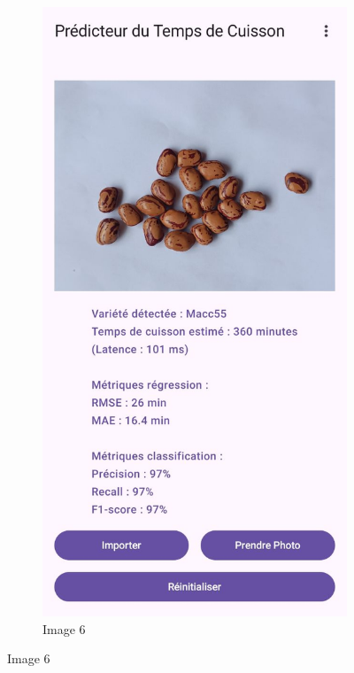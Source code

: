 \begin{figure}[H]
    \begin{subfigure}{0.24\textwidth}
        \centering
        \includegraphics[width=\linewidth]{figures/test6.jpg}
        \caption{Image 6}
    \end{subfigure}


\end{figure}

